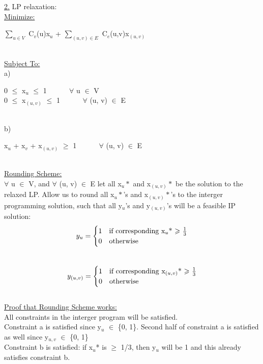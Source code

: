\documentclass[10pt]{csc_assignment}
\begin{document}
\begin{description}
\begin{flushleft}
\underline{2.} LP relaxation:\\
\underline{Minimize:}\\
\hspace*{1cm}\parbox{15cm}{
$\sum_{u \in V}$ C$_{v}$(u)x$_{u}$ + $\sum_{(u, v) \in E}$ C$_{e}$(u,v)x$_{(u, v)}$
}\\
\underline{Subject To:}\\
a) \\
\hspace*{1cm}\parbox{15cm}{
0 $\leqslant$ x$_{u}$ $\leqslant$ 1 ~~~~~ $\forall$ u $\in$ V\\ 
0 $\leqslant$ x$_{(u, v)}$ $\leqslant$ 1 ~~~~~ $\forall$ (u, v) $\in$ E\\ 
}\\
b)\\
\hspace*{1cm}\parbox{15cm}{
x$_{u}$ + x$_{v}$ + x$_{(u, v)}$ $\geqslant$ 1 ~~~~~ $\forall$ (u, v) $\in$ E\\
}\\
\underline{Rounding Scheme:}\\
$\forall$ u $\in$ V, and $\forall$ (u, v) $\in$ E let all x$_{u}*$ and x$_{(u, v)}*$ be the solution to the relaxed LP. Allow us to round all x$_{u}*$'s and x$_{(u, v)}*$'s to the interger programming solution, such that all y$_{u}$'s and y$_{(u, v)}$'s will be a feasible IP solution:\\
\[
y_{u} = 
\begin{cases} 
      \hfill 1 \hfill & \text{if corresponding x$_{u}$* $\geqslant$ $\frac{1}{3}$} \\
      \hfill 0 \hfill & \text{otherwise} \\
  \end{cases}
\]\\
\[
y_{(u, v)} = 
\begin{cases} 
      \hfill 1 \hfill & \text{if corresponding x$_{(u, v)}$* $\geqslant$ $\frac{1}{3}$} \\
      \hfill 0 \hfill & \text{otherwise} \\
  \end{cases}
\]\\
\underline{Proof that Rounding Scheme works:}\\
All constraints in the interger program will be satisfied.\\
Constraint a is satisfied since  y$_{u}$ $\in$ \{0, 1\}.  Second half of constraint a is satisfied as well since  y$_{u,v}$ $\in$ \{0, 1\}\\
Constraint b is satisfied:  if x$_{u}$* is $\geqslant$ 1/3, then y$_{u}$ will be 1 and this already satisfies constraint b.\\

\end{flushleft}
\end{description}
\end{document}
